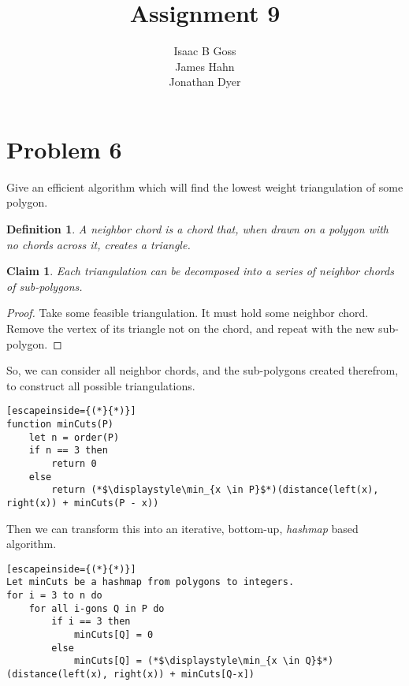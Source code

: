 \documentclass{article}
\author{Isaac B Goss\\ James Hahn\\ Jonathan Dyer}
\title{Assignment 9}
\newtheorem{thm}{Claim}
\newtheorem{defn}{Definition}
\providecommand{\prob}[1]{\section*{Problem #1}}
\begin{document}
\maketitle

    \prob{6}
    Give an efficient algorithm which will find the lowest weight triangulation of some polygon.
    \begin{defn}
        A neighbor chord is a chord that, when drawn on a polygon with no chords across it, creates a triangle.
    \end{defn}

    \begin{thm}
        Each triangulation can be decomposed into a series of neighbor chords of sub-polygons.
    \end{thm}
    \begin{proof}
        Take some feasible triangulation.
        It must hold some neighbor chord.
        Remove the vertex of its triangle not on the chord, and repeat with the new sub-polygon. 
    \end{proof}
    
    So, we can consider all neighbor chords, and the sub-polygons created therefrom, to construct all possible triangulations.
    
    \begin{lstlisting}[escapeinside={(*}{*)}]
function minCuts(P)
    let n = order(P)
    if n == 3 then
        return 0
    else
        return (*$\displaystyle\min_{x \in P}$*)(distance(left(x), right(x)) + minCuts(P - x))
    \end{lstlisting}
    
    Then we can transform this into an iterative, bottom-up, \emph{hashmap} based algorithm.
    
    \begin{lstlisting}[escapeinside={(*}{*)}]
Let minCuts be a hashmap from polygons to integers.
for i = 3 to n do
    for all i-gons Q in P do
        if i == 3 then
            minCuts[Q] = 0
        else
            minCuts[Q] = (*$\displaystyle\min_{x \in Q}$*)(distance(left(x), right(x)) + minCuts[Q-x])
    \end{lstlisting}
\end{document}

